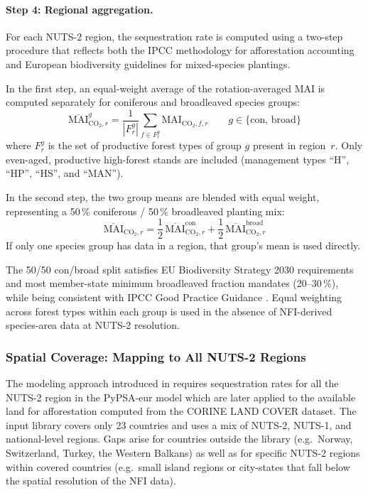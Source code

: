 \documentclass[12pt, a4paper]{article}
\begin{document}
\paragraph{Step 4: Regional aggregation.}
For each NUTS-2 region, the sequestration rate is computed using a two-step
procedure that reflects both the IPCC methodology for afforestation accounting
and European biodiversity guidelines for mixed-species plantings.

In the first step, an equal-weight average of the rotation-averaged MAI is
computed separately for coniferous and broadleaved species groups:
\begin{equation}
    \overline{\text{MAI}}^{g}_{\text{CO}_2, r}
    = \frac{1}{|F^{g}_r|} \sum_{f \in F^{g}_r} \text{MAI}_{\text{CO}_2, f, r}
    \qquad g \in \{\text{con},\, \text{broad}\}
    \label{eq:nuts2_group}
\end{equation}
where $F^{g}_r$ is the set of productive forest types of group $g$ present in
region~$r$.
Only even-aged, productive high-forest stands are included (management types
``H'', ``HP'', ``HS'', and ``MAN'').

In the second step, the two group means are blended with equal weight,
representing a 50\,\% coniferous / 50\,\% broadleaved planting mix:
\begin{equation}
    \overline{\text{MAI}}_{\text{CO}_2, r}
    = \frac{1}{2}\,\overline{\text{MAI}}^{\text{con}}_{\text{CO}_2, r}
    + \frac{1}{2}\,\overline{\text{MAI}}^{\text{broad}}_{\text{CO}_2, r}
    \label{eq:nuts2_agg}
\end{equation}
If only one species group has data in a region, that group's mean is used
directly.

The 50/50 con/broad split satisfies EU Biodiversity Strategy 2030 requirements
\citep{EC2020BiodiversityStrategy} and most member-state minimum broadleaved
fraction mandates (20--30\,\%), while being consistent with IPCC Good Practice
Guidance \citep{IPCC2006}. Equal weighting across forest types within each group
is used in the absence of NFI-derived species-area data at NUTS-2 resolution.

\subsubsection{Spatial Coverage: Mapping to All NUTS-2 Regions}
\label{sec:affo_nuts2_coverage}

The modeling approach introduced in \cite{Fernandes2026} requires sequestration rates for all the NUTS-2 region in the PyPSA-eur model which are later applied to the available land for afforestation computed from the CORINE LAND COVER dataset. The input library \cite{Pilli2024Zenodo} covers only 23 countries and uses a mix of NUTS-2, NUTS-1, and
national-level regions. Gaps arise for countries outside the library
(e.g.\ Norway, Switzerland, Turkey, the Western Balkans) as well as for
specific NUTS-2 regions within covered countries (e.g.\ small island regions
or city-states that fall below the spatial resolution of the NFI data).
\end{document}
